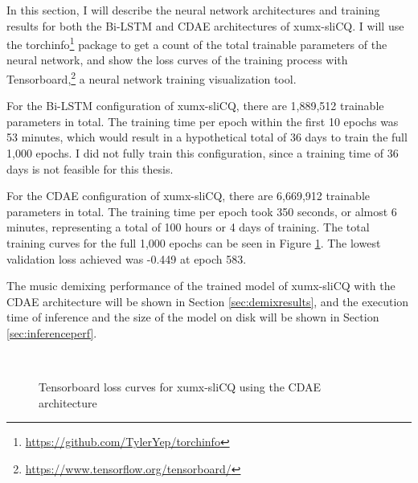 \documentclass[report.tex]{subfiles}
\begin{document}
In this section, I will describe the neural network architectures and training results for both the Bi-LSTM and CDAE architectures of xumx-sliCQ. I will use the torchinfo\footnote{\url{https://github.com/TylerYep/torchinfo}} package to get a count of the total trainable parameters of the neural network, and show the loss curves of the training process with Tensorboard,\footnote{\url{https://www.tensorflow.org/tensorboard/}} a neural network training visualization tool.

For the Bi-LSTM configuration of xumx-sliCQ, there are 1,889,512 trainable parameters in total. The training time per epoch within the first 10 epochs was 53 minutes, which would result in a hypothetical total of 36 days to train the full 1,000 epochs. I did not fully train this configuration, since a training time of 36 days is not feasible for this thesis.

For the CDAE configuration of xumx-sliCQ, there are 6,669,912 trainable parameters in total. The training time per epoch took 350 seconds, or almost 6 minutes, representing a total of 100 hours or 4 days of training. The total training curves for the full 1,000 epochs can be seen in Figure \ref{fig:networkloss}. The lowest validation loss achieved was -0.449 at epoch 583.

The music demixing performance of the trained model of xumx-sliCQ with the CDAE architecture will be shown in Section \ref{sec:demixresults}, and the execution time of inference and the size of the model on disk will be shown in Section \ref{sec:inferenceperf}.

\begin{figure}[ht]
	\centering
	\\
	\caption{Tensorboard loss curves for xumx-sliCQ using the CDAE architecture}
	\label{fig:networkloss}
\end{figure}
\end{document}
